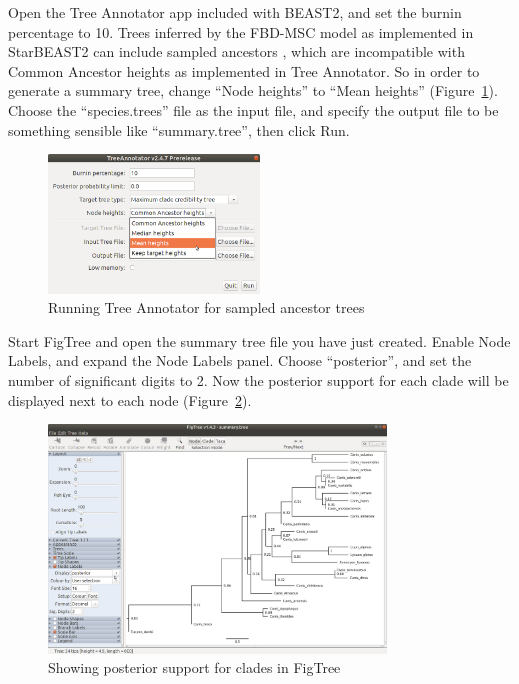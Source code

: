 \documentclass[12pt]{article}
\begin{document}
\clearpage

Open the Tree Annotator app included with BEAST2, and set the burnin
percentage to 10. Trees inferred by the FBD-MSC model as implemented in
StarBEAST2 can include sampled ancestors \parencite{Gavryushkina2014}, which are
incompatible with Common Ancestor heights \parencite{Heled2013} as implemented in
Tree Annotator. So in order to generate a summary tree, change ``Node heights'' to
``Mean heights'' (Figure~\ref{fig:treeAnnotatorMeanHeights}). Choose the
``species.trees'' file as the input file, and specify the output file to be
something sensible like ``summary.tree'', then click Run.

\begin{figure}[htb!]
\centering
\includegraphics[width=0.5\textwidth]{figures/treeAnnotatorMeanHeights.png}
\caption
{Running Tree Annotator for sampled ancestor trees}
\label{fig:treeAnnotatorMeanHeights}
\end{figure}

Start FigTree and open the summary tree file you have just created. Enable
Node Labels, and expand the Node Labels panel. Choose ``posterior'', and set
the number of significant digits to 2. Now the posterior support for each
clade will be displayed next to each node (Figure~\ref{fig:figtreeFBD}).

\clearpage

\begin{figure}[htb!]
\centering
\includegraphics[width=0.8\textwidth]{figures/figtreeFBD.png}
\caption
{Showing posterior support for clades in FigTree}
\label{fig:figtreeFBD}
\end{figure}
\end{document}
